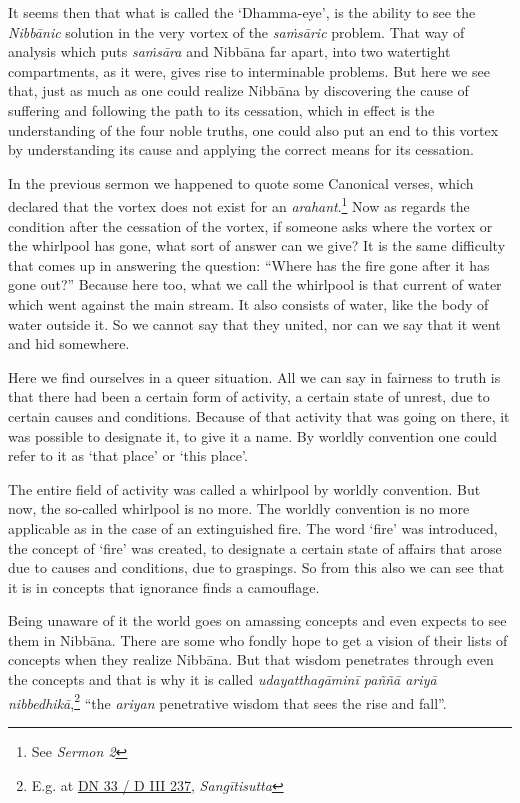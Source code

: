 It seems then that what is called the `Dhamma-eye', is the ability to see the \emph{Nibbānic} solution in the very vortex of the \emph{saṁsāric} problem. That way of analysis which puts \emph{saṁsāra} and Nibbāna far apart, into two watertight compartments, as it were, gives rise to interminable problems. But here we see that, just as much as one could realize Nibbāna by discovering the cause of suffering and following the path to its cessation, which in effect is the understanding of the four noble truths, one could also put an end to this vortex by understanding its cause and applying the correct means for its cessation.

In the previous sermon we happened to quote some Canonical verses, which declared that the vortex does not exist for an \emph{arahant}.\footnote{See \emph{Sermon 2}} Now as regards the condition after the cessation of the vortex, if someone asks where the vortex or the whirlpool has gone, what sort of answer can we give? It is the same difficulty that comes up in answering the question: ``Where has the fire gone after it has gone out?'' Because here too, what we call the whirlpool is that current of water which went against the main stream. It also consists of water, like the body of water outside it. So we cannot say that they united, nor can we say that it went and hid somewhere.

Here we find ourselves in a queer situation. All we can say in fairness to truth is that there had been a certain form of activity, a certain state of unrest, due to certain causes and conditions. Because of that activity that was going on there, it was possible to designate it, to give it a name. By worldly convention one could refer to it as `that place' or `this place'.

The entire field of activity was called a whirlpool by worldly convention. But now, the so-called whirlpool is no more. The worldly convention is no more applicable as in the case of an extinguished fire. The word `fire' was introduced, the concept of `fire' was created, to designate a certain state of affairs that arose due to causes and conditions, due to graspings. So from this also we can see that it is in concepts that ignorance finds a camouflage.

Being unaware of it the world goes on amassing concepts and even expects to see them in Nibbāna. There are some who fondly hope to get a vision of their lists of concepts when they realize Nibbāna. But that wisdom penetrates through even the concepts and that is why it is called \emph{udayatthagāminī paññā ariyā nibbedhikā},\footnote{E.g. at \href{https://suttacentral.net/dn33/pli/ms}{DN 33 / D III 237}, \emph{Sangītisutta}} ``the \emph{ariyan} penetrative wisdom that sees the rise and fall''.

